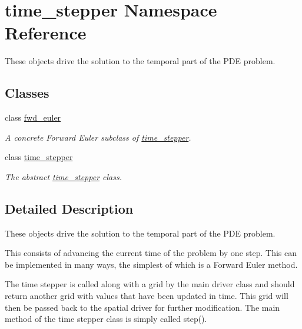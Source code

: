 \hypertarget{namespacetime__stepper}{}\section{time\+\_\+stepper Namespace Reference}
\label{namespacetime__stepper}


These objects drive the solution to the temporal part of the P\+DE problem.  


\subsection*{Classes}
\begin{DoxyCompactItemize}
\item 
class \hyperlink{classtime__stepper_1_1fwd__euler}{fwd\+\_\+euler}
\begin{DoxyCompactList}\small\item\em A concrete Forward Euler subclass of \hyperlink{classtime__stepper_1_1time__stepper}{time\+\_\+stepper}. \end{DoxyCompactList}\item 
class \hyperlink{classtime__stepper_1_1time__stepper}{time\+\_\+stepper}
\begin{DoxyCompactList}\small\item\em The abstract \hyperlink{classtime__stepper_1_1time__stepper}{time\+\_\+stepper} class. \end{DoxyCompactList}\end{DoxyCompactItemize}


\subsection{Detailed Description}
These objects drive the solution to the temporal part of the P\+DE problem. 

This consists of advancing the current time of the problem by one step. This can be implemented in many ways, the simplest of which is a Forward Euler method.

The time stepper is called along with a grid by the main driver class and should return another grid with values that have been updated in time. This grid will then be passed back to the spatial driver for further modification. The main method of the time stepper class is simply called step(). 